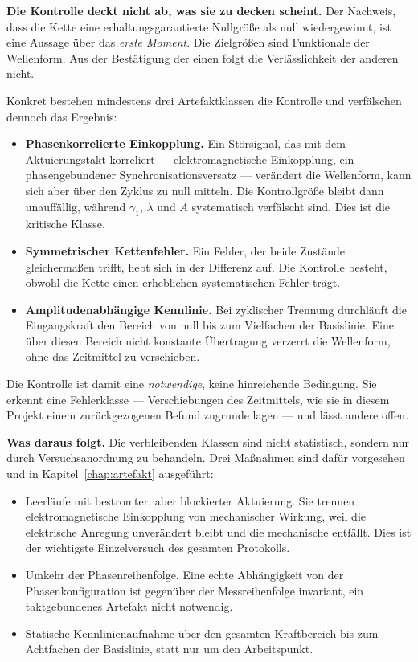 \documentclass[12pt,a4paper]{report}
\begin{document}
\textbf{Die Kontrolle deckt nicht ab, was sie zu decken scheint.} Der
Nachweis, dass die Kette eine erhaltungsgarantierte Nullgröße als null
wiedergewinnt, ist eine Aussage über das \emph{erste Moment}. Die
Zielgrößen sind Funktionale der Wellenform. Aus der Bestätigung der
einen folgt die Verlässlichkeit der anderen nicht.

Konkret bestehen mindestens drei Artefaktklassen die Kontrolle und
verfälschen dennoch das Ergebnis:

\begin{itemize}
    \item \textbf{Phasenkorrelierte Einkopplung.} Ein Störsignal, das
    mit dem Aktuierungstakt korreliert --- elektromagnetische
    Einkopplung, ein phasengebundener Synchronisationsversatz ---
    verändert die Wellenform, kann sich aber über den Zyklus zu null
    mitteln. Die Kontrollgröße bleibt dann unauffällig, während
    $\gamma_1$, $\lambda$ und $A$ systematisch verfälscht sind. Dies ist
    die kritische Klasse.
    \item \textbf{Symmetrischer Kettenfehler.} Ein Fehler, der beide
    Zustände gleichermaßen trifft, hebt sich in der Differenz auf. Die
    Kontrolle besteht, obwohl die Kette einen erheblichen systematischen
    Fehler trägt.
    \item \textbf{Amplitudenabhängige Kennlinie.} Bei zyklischer
    Trennung durchläuft die Eingangskraft den Bereich von null bis zum
    Vielfachen der Basislinie. Eine über diesen Bereich nicht konstante
    Übertragung verzerrt die Wellenform, ohne das Zeitmittel zu
    verschieben.
\end{itemize}

Die Kontrolle ist damit eine \emph{notwendige}, keine hinreichende
Bedingung. Sie erkennt eine Fehlerklasse --- Verschiebungen des
Zeitmittels, wie sie in diesem Projekt einem zurückgezogenen Befund
zugrunde lagen --- und lässt andere offen.

\vspace{0.5em}

\textbf{Was daraus folgt.} Die verbleibenden Klassen sind nicht
statistisch, sondern nur durch Versuchsanordnung zu behandeln. Drei
Maßnahmen sind dafür vorgesehen und in Kapitel~\ref{chap:artefakt}
ausgeführt:

\begin{itemize}
    \item Leerläufe mit bestromter, aber blockierter Aktuierung. Sie
    trennen elektromagnetische Einkopplung von mechanischer Wirkung,
    weil die elektrische Anregung unverändert bleibt und die mechanische
    entfällt. Dies ist der wichtigste Einzelversuch des gesamten
    Protokolls.
    \item Umkehr der Phasenreihenfolge. Eine echte Abhängigkeit von der
    Phasenkonfiguration ist gegenüber der Messreihenfolge invariant, ein
    taktgebundenes Artefakt nicht notwendig.
    \item Statische Kennlinienaufnahme über den gesamten Kraftbereich
    bis zum Achtfachen der Basislinie, statt nur um den Arbeitspunkt.
\end{itemize}
\end{document}
